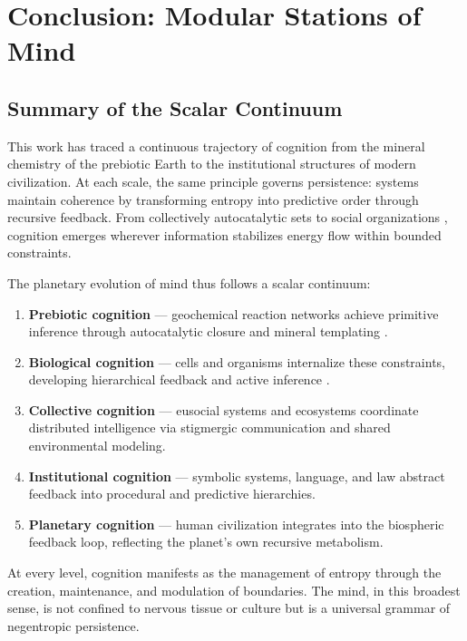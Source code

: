 \documentclass[11pt,a4paper]{article}
\begin{document}
\section{Conclusion: Modular Stations of Mind}
\label{sec:conclusion}

\subsection{Summary of the Scalar Continuum}

This work has traced a continuous trajectory of cognition from the mineral chemistry of the prebiotic Earth to the institutional structures of modern civilization.  At each scale, the same principle governs persistence: systems maintain coherence by transforming entropy into predictive order through recursive feedback.  From collectively autocatalytic sets \citep{Kauffman1993OriginsOfOrder} to social organizations \citep{Hutchins1995CognitionInTheWild}, cognition emerges wherever information stabilizes energy flow within bounded constraints.

The planetary evolution of mind thus follows a scalar continuum:

\begin{enumerate}
    \item \textbf{Prebiotic cognition} — geochemical reaction networks achieve primitive inference through autocatalytic closure and mineral templating \citep{Hazen2008MineralEvolution}.
    \item \textbf{Biological cognition} — cells and organisms internalize these constraints, developing hierarchical feedback and active inference \citep{Friston2013LifeAsWeKnowIt}.
    \item \textbf{Collective cognition} — eusocial systems and ecosystems coordinate distributed intelligence via stigmergic communication and shared environmental modeling.
    \item \textbf{Institutional cognition} — symbolic systems, language, and law abstract feedback into procedural and predictive hierarchies.
    \item \textbf{Planetary cognition} — human civilization integrates into the biospheric feedback loop, reflecting the planet’s own recursive metabolism.
\end{enumerate}

At every level, cognition manifests as the management of entropy through the creation, maintenance, and modulation of boundaries.  The mind, in this broadest sense, is not confined to nervous tissue or culture but is a universal grammar of negentropic persistence.
\end{document}
